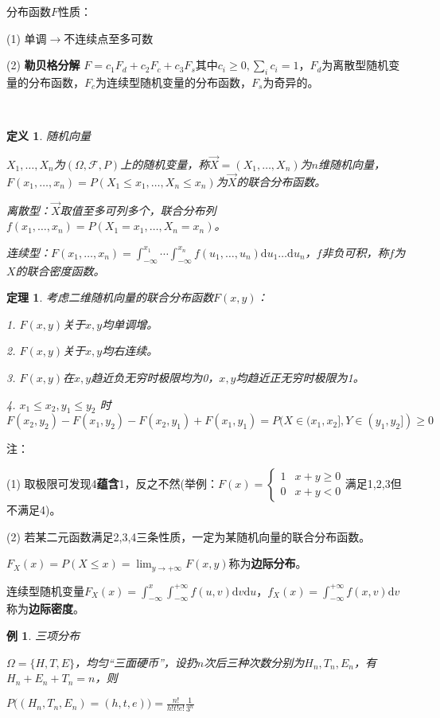 \documentclass[a4paper,UTF8,fontset=windows]{ctexart}
\newtheorem{thm}{定理}[section]
\newtheorem{exmp}{例}[section]
\newtheorem{defi}{定义}[section]
\begin{document}
分布函数$F$性质：

(1) 单调$\to$不连续点至多可数

(2) \textbf{勒贝格分解} $F=c_1F_d+c_2F_c+c_3F_s$其中$c_i\ge0,\sum_ic_i=1$，$F_d$为离散型随机变量的分布函数，$F_c$为连续型随机变量的分布函数，$F_s$为奇异的。

~

\begin{defi} 随机向量

$X_1,\dots,X_n$为$(\Omega,\mathcal{F},P)$上的随机变量，称$\vec{X}=(X_1,\dots,X_n)$为$n$维随机向量，$F(x_1,\dots,x_n)=P(X_1\le x_1,\dots,X_n\le x_n)$为$\vec{X}$的联合分布函数。

离散型：$\vec{X}$取值至多可列多个，\emph{联合分布列}$f(x_1,\dots,x_n)=P(X_1=x_1,\dots,X_n=x_n)$。

连续型：$F(x_1,\dots,x_n)=\int_{-\infty}^{x_1}\cdots\int_{-\infty}^{x_n}f(u_1,\dots,u_n)\mathrm{d}u_1\dots\mathrm{d}u_n$，$f$非负可积，称$f$为$X$的\emph{联合密度函数}。
\end{defi}

\begin{thm}
考虑二维随机向量的联合分布函数$F(x,y)$：

1. $F(x,y)$关于$x,y$均单调增。

2. $F(x,y)$关于$x,y$均右连续。

3. $F(x,y)$在$x,y$趋近负无穷时极限均为0，$x,y$均趋近正无穷时极限为1。

4. $x_1\le x_2,y_1\le y_2$ 时$F(x_2,y_2)-F(x_1,y_2)-F(x_2,y_1)+F(x_1,y_1)=P(X\in(x_1,x_2],Y\in(y_1,y_2])\ge0$
\end{thm}

注：

(1) 取极限可发现4\textbf{蕴含}1，反之不然(举例：$F(x)=\begin{cases}1&x+y\ge0\\0&x+y<0\end{cases}$满足1,2,3但不满足4)。

(2) 若某二元函数满足2,3,4三条性质，一定为某随机向量的联合分布函数。

$F_X(x)=P(X\le x)=\lim_{y\to+\infty}F(x,y)$称为\textbf{边际分布}。

连续型随机变量$F_X(x)=\int_{-\infty}^x\int_{-\infty}^{+\infty}f(u,v)\mathrm{d}v\mathrm{d}u$，$f_X(x)=\int_{-\infty}^{+\infty}f(x,v)\mathrm{d}v$称为\textbf{边际密度}。

\begin{exmp} 三项分布

$\Omega=\{H,T,E\}$，均匀“三面硬币”，设扔$n$次后三种次数分别为$H_n,T_n,E_n$，有$H_n+E_n+T_n=n$，则

$P\big((H_n,T_n,E_n)=(h,t,e)\big)=\frac{n!}{h!t!e!}\frac{1}{3^n}$
\end{exmp}
\end{document}
